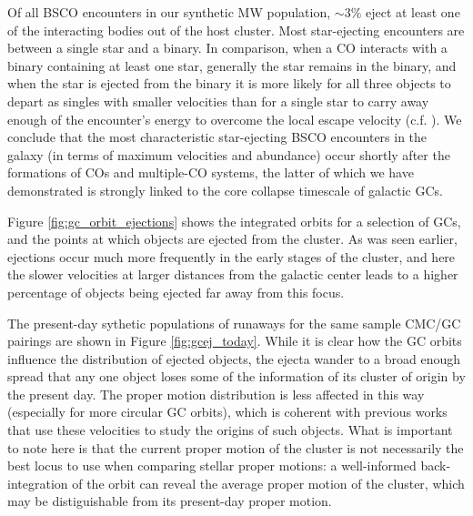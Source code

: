 \documentclass[twocolumn]{aastex631}
\begin{document}
Of all BSCO encounters in our synthetic MW population, $\sim3\%$ eject at least one of the interacting bodies out of the host cluster.
Most star-ejecting encounters are between a single star and a binary.
In comparison, when a CO interacts with a binary containing at least one star, generally the star remains in the binary, and when the star is ejected from the binary it is more likely for all three objects to depart as singles with smaller velocities than for a single star to carry away enough of the encounter's energy to overcome the local escape velocity (c.f. \citet{1983ApJ...268..319H}).
We conclude that the most characteristic star-ejecting BSCO encounters in the galaxy (in terms of maximum velocities and abundance) occur shortly after the formations of COs and multiple-CO systems, the latter of which we have demonstrated is strongly linked to the core collapse timescale of galactic GCs.

Figure \ref{fig:gc_orbit_ejections} shows the integrated orbits for a selection of GCs, and the points at which objects are ejected from the cluster.
As was seen earlier, ejections occur much more frequently in the early stages of the cluster, and here the slower velocities at larger distances from the galactic center leads to a higher percentage of objects being ejected far away from this focus.

\begin{figure*}
    \caption{
        Plots showing the back-integrated orbits for some MW GCs, and the points in the orbit where an object is ejected from the GC.
        The color scale of the points indicates the time of ejection, measured backward from the present day; from the partial monochromism of the data and the density of points for portions of the orbit it can be seen how the ejections are more concentrated earlier in the cluster's evolution and farther away from the galactic center.
    }
    \label{fig:gc_orbit_ejections}
\end{figure*}

The present-day sythetic populations of runaways for the same sample CMC/GC pairings are shown in Figure \ref{fig:gcej_today}.
While it is clear how the GC orbits influence the distribution of ejected objects, the ejecta wander to a broad enough spread that any one object loses some of the information of its cluster of origin by the present day.
The proper motion distribution is less affected in this way (especially for more circular GC orbits), which is coherent with previous works that use these velocities to study the origins of such objects.
What is important to note here is that the current proper motion of the cluster is not necessarily the best locus to use when comparing stellar proper motions: a well-informed back-integration of the orbit can reveal the average proper motion of the cluster, which may be distiguishable from its present-day proper motion.
\end{document}
